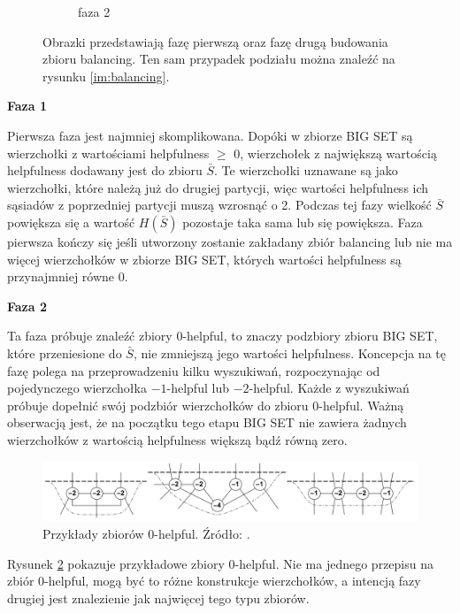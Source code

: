\begin{figure}[h]
\begin{subfigure}{.32\textwidth}
    \caption[short]{faza 2}
\end{subfigure}
\caption{Obrazki przedstawiają fazę pierwszą oraz fazę drugą budowania zbioru balancing.
Ten sam przypadek podziału można znaleźć na rysunku \ref{im:balancing}.}
\label{im:balancing:details}
\end{figure}

\textbf{Faza 1}

Pierwsza faza jest najmniej skomplikowana.
Dopóki w zbiorze BIG SET są wierzchołki z wartościami helpfulness $\geq$ $0$, wierzchołek z największą wartością
helpfulness dodawany jest do zbioru $\bar{S}$.
Te wierzchołki uznawane są jako wierzchołki, które należą już do drugiej partycji, więc wartości helpfulness
ich sąsiadów z poprzedniej partycji muszą wzrosnąć o 2.
Podczas tej fazy wielkość $\bar{S}$ powiększa się a wartość $H(\bar{S})$ pozostaje taka sama lub się powiększa.
Faza pierwsza kończy się jeśli utworzony zostanie zakładany zbiór balancing lub nie ma więcej wierzchołków
w zbiorze BIG SET, których wartości helpfulness są przynajmniej równe 0.

\vspace{8mm}
\textbf{Faza 2}

Ta faza próbuje znaleźć zbiory $0$-helpful, to znaczy podzbiory zbioru BIG SET, które przeniesione do $\bar{S}$,
nie zmniejszą jego wartości helpfulness.
Koncepcja na tę fazę polega na przeprowadzeniu kilku wyszukiwań, rozpoczynając od pojedynczego wierzchołka
$-1$-helpful lub $-2$-helpful.
Każde z wyszukiwań próbuje dopełnić swój podzbiór wierzchołków do zbioru $0$-helpful.
Ważną obserwacją jest, że na początku tego etapu BIG SET nie zawiera żadnych wierzchołków z wartością
helpfulness większą bądź równą zero.

\begin{figure}[h]
    \centering
    \includegraphics[width=0.95\linewidth]{images/0-helpful-sets}
    \caption{Przykłady zbiorów 0-helpful. Źródło: \cite{article}.}
    \label{im:0-helpful}
\end{figure}

Rysunek \ref{im:0-helpful} pokazuje przykładowe zbiory $0$-helpful.
Nie ma jednego przepisu na zbiór $0$-helpful, mogą być to różne konstrukcje wierzchołków, a intencją fazy drugiej
jest znalezienie jak najwięcej tego typu zbiorów.

